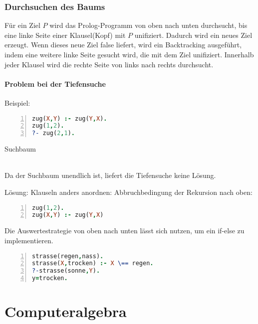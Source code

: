 \documentclass[a4paper]{scrartcl}
\begin{document}
\subsubsection{Durchsuchen des Baums} Für ein Ziel $P$ wird das Prolog-Programm von oben nach unten durchsucht, bis eine linke Seite einer Klausel(Kopf) mit $P$ unifiziert. Dadurch wird ein neues Ziel erzeugt. Wenn dieses neue Ziel false liefert, wird ein Backtracking ausgeführt, indem eine weitere linke Seite gesucht wird, die mit dem Ziel unifiziert. Innerhalb jeder Klausel wird die rechte Seite von links nach rechts durchsucht.
\paragraph{Problem bei der Tiefensuche}
Beispiel: 
\begin{lstlisting}[numbers=left, tabsize=4, language=Prolog]
zug(X,Y) :- zug(Y,X).
zug(1,2).
?- zug(2,1).
\end{lstlisting}
Suchbaum\\
\\
Da der Suchbaum unendlich ist, liefert die Tiefensuche keine Lösung.

Lösung: Klauseln anders anordnen: Abbruchbedingung der Rekursion nach oben:
\begin{lstlisting}[numbers=left, tabsize=4, language=Prolog]
zug(1,2).
zug(X,Y) :- zug(Y,X)
\end{lstlisting}

Die Auswertestrategie von oben nach unten lässt sich nutzen, um ein if-else zu implementieren.
\begin{lstlisting}[numbers=left, tabsize=4, language=Prolog]
strasse(regen,nass).
strasse(X,trocken) :- X \== regen.
?-strasse(sonne,Y).
y=trocken.
\end{lstlisting}

\section{Computeralgebra}
\end{document}
